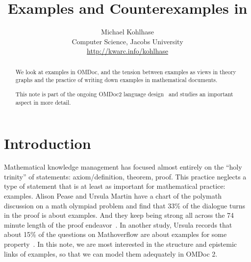 \documentclass[11pt]{bluenote}
\title{Examples and Counterexamples in \omdoc}
\author{Michael Kohlhase\\Computer Science,  Jacobs University\\\url{http://kwarc.info/kohlhase}}
\def\omdoc{OMDoc\xspace}
\def\omdocv#1{OMDoc#1\xspace}
\def\omdoc{OMDoc\xspace}
\begin{document}
\maketitle
\begin{abstract}
  We look at examples in \omdoc, and the tension between examples as views in theory
  graphs and the practice of writing down examples in mathematical documents. 

  This note is part of the ongoing \omdocv2 language design~\cite{Kohlhase:old13} and
  studies an important aspect in more detail.
\end{abstract}
\tableofcontents\newpage

\section{Introduction}

Mathematical knowledge management has focused almost entirely on the ``holy trinity'' of
statements: axiom/definition, theorem, proof. This practice neglects a type of statement
that is at least as important for mathematical practice: examples.  Alison Pease and
Ursula Martin have a chart of the polymath discussion on a math olympiad problem and find
that 33\% of the dialogue turns in the proof is about examples. And they keep being strong
all across the 74 minute length of the proof endeavor~\cite{PeaMar:sfmm12}. In another
study, Ursula records that about 15\% of the questions on Mathoverflow are about examples
for some property~\cite{MarPea:wmtapm13}. In this note, we are most interested in the
structure and epistemic links of examples, so that we can model them adequately in
\omdoc2. 
\end{document}
